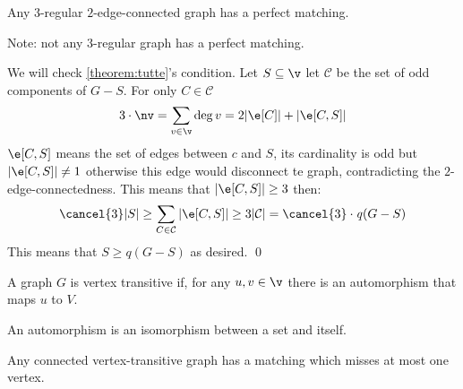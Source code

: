 \begin{customlemma}{2.9}
\label{lemma:2.9}
    Any $3$-regular $2$-edge-connected graph has a perfect matching.
\end{customlemma}
Note: not any $3$-regular graph has a perfect matching.
\begin{prf}
    We will check \ref{theorem:tutte}'s condition. Let $S \subseteq \v$ let $\mathcal{C}$ be the set of odd components of $G - S$. For only $C \in \mathcal{C}$
    \begin{equation*}
        3 \cdot \nv = \sum_{v \in \v}\deg{v} = 2|\e[C]| + |\e[C, S]|
    \end{equation*}
    $\e[C, S]$ means the set of edges between $c$ and $S$, its cardinality is odd but $|\e[C, S]| \neq 1$ otherwise this edge would disconnect te graph, contradicting the $2$-edge-connectedness. This means that $|\e[C, S]| \geq 3$ then:
    \begin{equation*}
        \cancel{3}|S| \geq \sum_{C \in \mathcal{C}}{|\e[C, S]| \geq 3|\mathcal{C}| = \cancel{3} \cdot \mathit{q}(G - S)}
    \end{equation*}
    This means that $S \geq \mathit{q}(G - S)$ as desired. \qed
\end{prf}
A graph $G$ is vertex transitive if, for any $u, v \in \v$ there is an automorphism that maps $u$ to $V$.
\begin{definition}[Automorphism]
    An automorphism is an isomorphism between a set and itself.    
\end{definition}
\begin{customtheorem}{2.10}
\label{theorem:2.10}
    Any connected vertex-transitive graph has a matching which misses at most one vertex.
\end{customtheorem}
